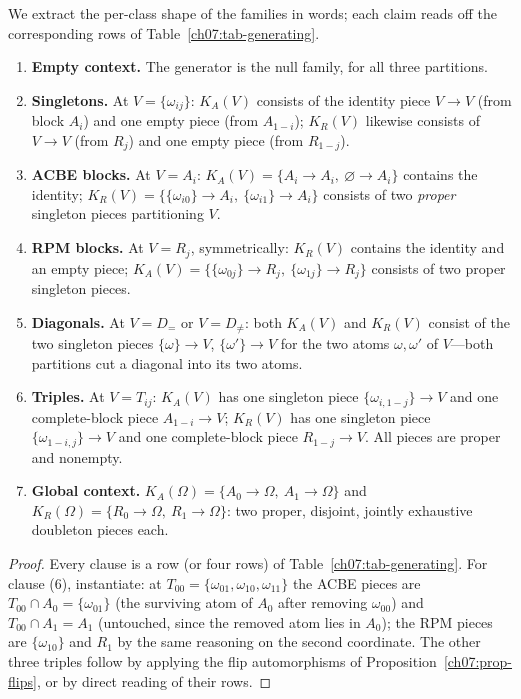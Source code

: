 We extract the per-class shape of the families in words; each claim reads off the corresponding rows of Table~\ref{ch07:tab-generating}.

\begin{proposition}\label{ch07:prop-shapes}
\begin{enumerate}
\item \textbf{Empty context.} The generator is the null family, for all three partitions.
\item \textbf{Singletons.} At $V=\{\omega_{ij}\}$: $K_{A}(V)$ consists of the identity piece $V\to V$ (from block $A_{i}$) and one empty piece (from $A_{1-i}$); $K_{R}(V)$ likewise consists of $V\to V$ (from $R_{j}$) and one empty piece (from $R_{1-j}$).
\item \textbf{ACBE blocks.} At $V=A_{i}$: $K_{A}(V)=\{A_{i}\to A_{i},\ \varnothing\to A_{i}\}$ contains the identity; $K_{R}(V)=\{\{\omega_{i0}\}\to A_{i},\ \{\omega_{i1}\}\to A_{i}\}$ consists of two \emph{proper} singleton pieces partitioning $V$.
\item \textbf{RPM blocks.} At $V=R_{j}$, symmetrically: $K_{R}(V)$ contains the identity and an empty piece; $K_{A}(V)=\{\{\omega_{0j}\}\to R_{j},\ \{\omega_{1j}\}\to R_{j}\}$ consists of two proper singleton pieces.
\item \textbf{Diagonals.} At $V=D_{=}$ or $V=D_{\neq}$: both $K_{A}(V)$ and $K_{R}(V)$ consist of the two singleton pieces $\{\omega\}\to V$, $\{\omega'\}\to V$ for the two atoms $\omega,\omega'$ of $V$---both partitions cut a diagonal into its two atoms.
\item \textbf{Triples.} At $V=T_{ij}$: $K_{A}(V)$ has one singleton piece $\{\omega_{i,1-j}\}\to V$ and one complete-block piece $A_{1-i}\to V$; $K_{R}(V)$ has one singleton piece $\{\omega_{1-i,j}\}\to V$ and one complete-block piece $R_{1-j}\to V$. All pieces are proper and nonempty.
\item \textbf{Global context.} $K_{A}(\Omega)=\{A_{0}\to\Omega,\ A_{1}\to\Omega\}$ and $K_{R}(\Omega)=\{R_{0}\to\Omega,\ R_{1}\to\Omega\}$: two proper, disjoint, jointly exhaustive doubleton pieces each.
\end{enumerate}
\end{proposition}

\begin{proof}
Every clause is a row (or four rows) of Table~\ref{ch07:tab-generating}. For clause (6), instantiate: at $T_{00}=\{\omega_{01},\omega_{10},\omega_{11}\}$ the ACBE pieces are $T_{00}\cap A_{0}=\{\omega_{01}\}$ (the surviving atom of $A_{0}$ after removing $\omega_{00}$) and $T_{00}\cap A_{1}=A_{1}$ (untouched, since the removed atom lies in $A_{0}$); the RPM pieces are $\{\omega_{10}\}$ and $R_{1}$ by the same reasoning on the second coordinate. The other three triples follow by applying the flip automorphisms of Proposition~\ref{ch07:prop-flips}, or by direct reading of their rows.
\end{proof}

